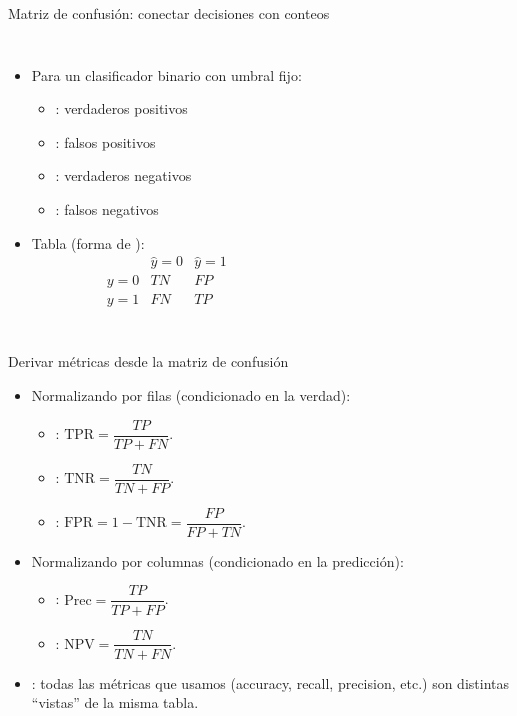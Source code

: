 \begin{frame}{Matriz de confusión: conectar decisiones con conteos}
\small
\begin{columns}[T,onlytextwidth]
\begin{itemize}
  \item Para un clasificador binario con umbral fijo:
  \begin{itemize}
    \item {}: verdaderos positivos
    \item {}: falsos positivos
    \item {}: verdaderos negativos
    \item {}: falsos negativos
  \end{itemize}
  \item Tabla (forma de ):
  \[
  \begin{array}{c|cc}
        & \hat{y}=0 & \hat{y}=1 \\
    \hline
    y=0 & TN       & FP       \\
    y=1 & FN       & TP
  \end{array}
  \]
\end{itemize}
\centering
\vspace{1em}
\end{columns}
\end{frame}

\begin{frame}{Derivar métricas desde la matriz de confusión}
\small
\begin{itemize}
  \item Normalizando por filas (condicionado en la verdad): \hfill {}
  \begin{itemize}
    \item {}: \( \mathrm{TPR} = \dfrac{TP}{TP + FN} \).
    \item {}: \( \mathrm{TNR} = \dfrac{TN}{TN + FP} \).
    \item {}: \( \mathrm{FPR} = 1-\mathrm{TNR} = \dfrac{FP}{FP + TN} \).
  \end{itemize}
  \item Normalizando por columnas (condicionado en la predicción):
  \begin{itemize}
    \item {}: \( \mathrm{Prec} = \dfrac{TP}{TP + FP} \).
    \item {}: \( \mathrm{NPV} = \dfrac{TN}{TN + FN} \).
  \end{itemize}
  \item {}: todas las métricas que usamos (accuracy, recall, precision, etc.) son distintas “vistas” de la misma tabla.
\end{itemize}
\end{frame}

